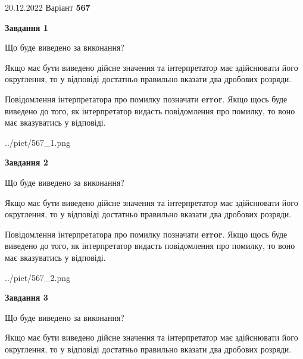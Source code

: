 \documentclass[12pt, ukrainian]{article}
\begin{document}
{20.12.2022 Варіант \No \textbf { 567 }\par}
{
\begin {Large}

{\begin {center}\textbf{Завдання 1}\end {center}}\par
Що буде виведено за виконання? \par

Якщо має бути виведено дійсне значення та інтерпретатор має здійснювати його округлення, 
то у відповіді достатньо правильно вказати два дробових розряди.

Повідомлення інтерпретатора про помилку позначати \textbf{error}.
Якщо щось буде виведено до того, як інтерпретатор видасть повідомлення про помилку, 
то воно має вказуватись у відповіді. \par

\begin{center}
	{../pict/567_1.png}
\end{center}
\newpage

{\begin {center}\textbf{Завдання 2}\end {center}}\par
Що буде виведено за виконання? \par

Якщо має бути виведено дійсне значення та інтерпретатор має здійснювати його округлення, 
то у відповіді достатньо правильно вказати два дробових розряди.

Повідомлення інтерпретатора про помилку позначати \textbf{error}.
Якщо щось буде виведено до того, як інтерпретатор видасть повідомлення про помилку, 
то воно має вказуватись у відповіді. \par

\begin{center}
	{../pict/567_2.png}
\end{center}
\newpage

{\begin {center}\textbf{Завдання 3}\end {center}}\par
Що буде виведено за виконання? \par

Якщо має бути виведено дійсне значення та інтерпретатор має здійснювати його округлення, 
то у відповіді достатньо правильно вказати два дробових розряди.


\end{Large}}
\end{document}
